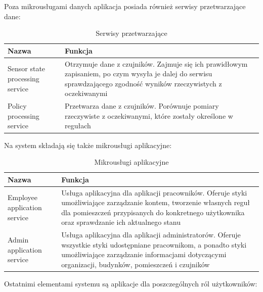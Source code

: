 \documentclass[11pt, a4]{article} %
\begin{document}
Poza mikrousługami danych aplikacja posiada również serwisy przetwarzające dane:

\begin{table}[!ht]
    \caption{Serwisy przetwarzające}
    \label{tab:serwisy-przetwarzajace}
    \begin{tabularx}{1\textwidth} { 
        | >{\raggedright\arraybackslash}X        
        | >{\raggedleft\arraybackslash}X | }
        \hline
       Nazwa & Funkcja \\
       \hline
       Sensor state processing service & 
       Otrzymuje dane z czujników. Zajmuje się ich prawidłowym zapisaniem, po czym wysyła 
       je dalej do serwisu sprawdzającego zgodność wyników rzeczywistych z oczekiwanymi \\
       \hline
       Policy processing service &
       Przetwarza dane z czujników. Porównuje pomiary rzeczywiste z oczekiwanymi, które 
       zostały określone w regułach \\
       \hline
    \end{tabularx}
\end{table}

Na system składają się także mikrousługi aplikacyjne:

\begin{table}[!ht]
    \caption{Mikrousługi aplikacyjne}
    \label{tab:mikrouslugi-aplikacyjne}
    \begin{tabularx}{1\textwidth} { 
        | >{\raggedright\arraybackslash}X        
        | >{\raggedleft\arraybackslash}X | }
        \hline
       Nazwa & Funkcja \\
       \hline
       Employee application service & 
       Usługa aplikacyjna dla aplikacji pracowników. Oferuje styki umożliwiające 
       zarządzanie kontem, tworzenie własnych reguł dla pomieszczeń przypisanych do 
       konkretnego użytkownika oraz sprawdzanie ich aktualnego stanu \\
       \hline
       Admin application service &
       Usługa aplikacyjna dla aplikacji administratorów. Oferuje wszystkie styki 
       udostępniane pracownikom, a ponadto styki umożliwiające zarządzanie informacjami 
       dotyczącymi organizacji, budynków, pomieszczeń i czujników \\
       \hline
    \end{tabularx}
\end{table}

Ostatnimi elementami systemu są aplikacje dla poszczególnych ról użytkowników:
\end{document}
